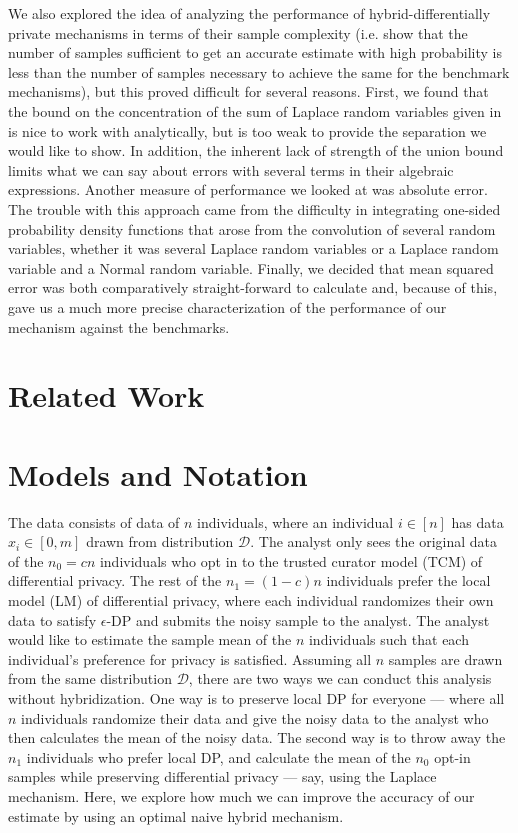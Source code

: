 \documentclass{article}
\theoremstyle{plain}
\begin{document}
We also explored the idea of analyzing the performance of hybrid-differentially private mechanisms in terms of their sample complexity (i.e. show that the number of samples sufficient to get an accurate estimate with high probability is less than the number of samples necessary to achieve the same for the benchmark mechanisms), but this proved difficult for several reasons. First, we found that the bound on the concentration of the sum of Laplace random variables given in \cite{Chan:2011:PCR:2043621.2043626} is nice to work with analytically, but is too weak to provide the separation we would like to show. In addition, the inherent lack of strength of the union bound limits what we can say about errors with several terms in their algebraic expressions. Another measure of performance we looked at was absolute error. The trouble with this approach came from the difficulty in integrating one-sided probability density functions that arose from the convolution of several random variables, whether it was several Laplace random variables or a Laplace random variable and a Normal random variable. Finally, we decided that mean squared error was both comparatively straight-forward to calculate and, because of this, gave us a much more precise characterization of the performance of our mechanism against the benchmarks. 

\section{Related Work}


\section{Models and Notation}
The data consists of data of $n$ individuals, where an individual $i \in [n]$ has data $x_i \in [0, m]$ drawn from distribution $\mathcal{D}$. The analyst only sees the original data of the $n_0 = c n$ individuals who opt in to the trusted curator model (TCM) of differential privacy. The rest of the $n_1 = (1-c) n$ individuals prefer the local model (LM) of differential privacy, where each individual randomizes their own data to satisfy $\epsilon$-DP and submits the noisy sample to the analyst. The analyst would like to estimate the sample mean of the $n$ individuals such that each individual's preference for privacy is satisfied. Assuming all $n$ samples are drawn from the same distribution $\mathcal{D}$, there are two ways we can conduct this analysis without hybridization. One way is to preserve local DP for everyone — where all $n$ individuals randomize their data and give the noisy data to the analyst who then calculates the mean of the noisy data. The second way is to throw away the $n_1$ individuals who prefer local DP, and calculate the mean of the $n_0$ opt-in samples while preserving differential privacy — say, using the Laplace mechanism. Here, we explore how much we can improve the accuracy of our estimate by using an optimal naive hybrid mechanism. 
\end{document}
